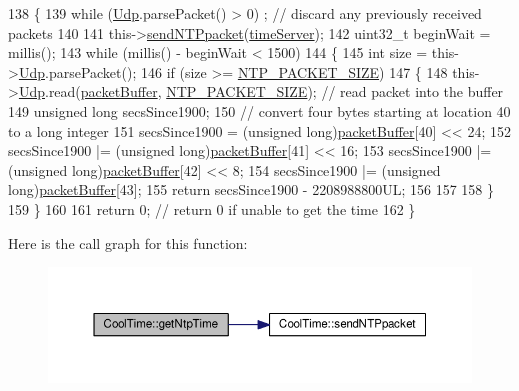 \begin{DoxyCode}
138 \{
139     \textcolor{keywordflow}{while} (\hyperlink{classCoolTime_a4e23216a8121ca79d0fb019f30884b92}{Udp}.parsePacket() > 0) ; \textcolor{comment}{// discard any previously received packets}
140 
141     this->\hyperlink{classCoolTime_a236a38d120dc53bc67456d763838c5a1}{sendNTPpacket}(\hyperlink{classCoolTime_ad2b9858f399108cb440dd1e908916f04}{timeServer});
142     uint32\_t beginWait = millis();
143     \textcolor{keywordflow}{while} (millis() - beginWait < 1500) 
144     \{
145         \textcolor{keywordtype}{int} size = this->\hyperlink{classCoolTime_a4e23216a8121ca79d0fb019f30884b92}{Udp}.parsePacket();
146         \textcolor{keywordflow}{if} (size >= \hyperlink{CoolTime_8h_a56a6ea64006651b4f42adf713e244f06}{NTP\_PACKET\_SIZE}) 
147         \{
148             this->\hyperlink{classCoolTime_a4e23216a8121ca79d0fb019f30884b92}{Udp}.read(\hyperlink{classCoolTime_a27e6abc82a5c2f72161956967005bec7}{packetBuffer}, \hyperlink{CoolTime_8h_a56a6ea64006651b4f42adf713e244f06}{NTP\_PACKET\_SIZE});  \textcolor{comment}{// read packet
       into the buffer}
149             \textcolor{keywordtype}{unsigned} \textcolor{keywordtype}{long} secsSince1900;
150             \textcolor{comment}{// convert four bytes starting at location 40 to a long integer}
151             secsSince1900 =  (\textcolor{keywordtype}{unsigned} long)\hyperlink{classCoolTime_a27e6abc82a5c2f72161956967005bec7}{packetBuffer}[40] << 24;
152             secsSince1900 |= (\textcolor{keywordtype}{unsigned} long)\hyperlink{classCoolTime_a27e6abc82a5c2f72161956967005bec7}{packetBuffer}[41] << 16;
153             secsSince1900 |= (\textcolor{keywordtype}{unsigned} long)\hyperlink{classCoolTime_a27e6abc82a5c2f72161956967005bec7}{packetBuffer}[42] << 8;
154             secsSince1900 |= (\textcolor{keywordtype}{unsigned} long)\hyperlink{classCoolTime_a27e6abc82a5c2f72161956967005bec7}{packetBuffer}[43];
155                 \textcolor{keywordflow}{return} secsSince1900 - 2208988800UL;
156 
157 
158         \}
159     \}
160 
161     \textcolor{keywordflow}{return} 0; \textcolor{comment}{// return 0 if unable to get the time}
162 \}
\end{DoxyCode}
Here is the call graph for this function\+:
\nopagebreak
\begin{figure}[H]
\begin{center}
\leavevmode
\includegraphics[width=350pt]{classCoolTime_a41fbbbfd651c2079f54d4b2911e4c705_cgraph}
\end{center}
\end{figure}
